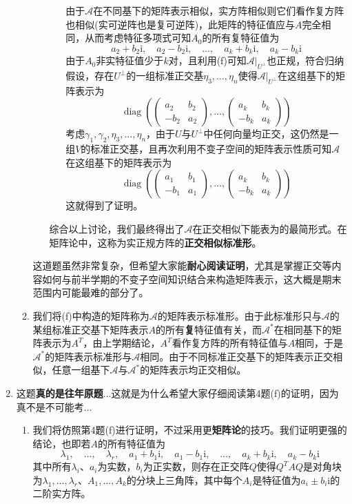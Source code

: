 \documentclass[a4paper,UTF8,fontset=windows,AutoFakeBold]{ctexart}
\DeclareMathOperator{\diag}{diag}
\newcommand*{\ir}{\mathrm{i}}
\newcommand*{\ma}{\mathcal{A}}
\newcommand*{\note}{\noindent *}
\begin{document}
\begin{enumerate}
\begin{enumerate}
\begin{itemize}
\begin{itemize}
                由于$\ma$在不同基下的矩阵表示相似，实方阵相似则它们看作复方阵也相似(实可逆阵也是复可逆阵)，此矩阵的特征值应与$A$完全相同，从而考虑特征多项式可知$A_0$的所有复特征值为
                $$a_2+b_2\ir,\quad a_2-b_2\ir,\quad\dots,\quad a_k+b_k\ir,\quad a_k-b_k\ir$$
                由于$A_0$非实特征值少于$k$对，且利用(f)可知$\ma|_{U^\bot}$也正规，符合归纳假设，存在$U^\bot$的一组标准正交基$\eta_3,\dots,\eta_n$使得$\ma|_{U^\bot}$在这组基下的矩阵表示为
                $$\diag\left(\begin{pmatrix}a_2&b_2\\-b_2&a_2\end{pmatrix},\dots,\begin{pmatrix}a_k&b_k\\-b_k&a_k\end{pmatrix}\right)$$
                考虑$\gamma_1,\gamma_2,\eta_3,\dots,\eta_n$，由于$U$与$U^\bot$中任何向量均正交，这仍然是一组$V$的标准正交基，且再次利用不变子空间的矩阵表示性质可知$\ma$在这组基下的矩阵表示为
                $$\diag\left(\begin{pmatrix}a_1&b_1\\-b_1&a_1\end{pmatrix},\dots,\begin{pmatrix}a_k&b_k\\-b_k&a_k\end{pmatrix}\right)$$
                这就得到了证明。
            \end{itemize}
            \note 综合以上讨论，我们最终得出了$\ma$在正交相似下能表为的最简形式。在矩阵论中，这称为实正规方阵的\textbf{正交相似标准形}。
        \end{itemize}

        \note 这道题虽然非常复杂，但希望大家能\textbf{耐心阅读证明}，尤其是掌握正交等内容如何与前半学期的不变子空间知识结合来构造矩阵表示，这大概是期末范围内可能最难的部分了。

        \item 我们将(f)中构造的矩阵称为$\ma$的矩阵表示标准形。由于此标准形只与$\ma$的某组标准正交基下矩阵表示$A$的所有\textbf{复}特征值有关，而$\ma^*$在相同基下的矩阵表示为$A^T$，由上学期结论，$A^T$看作复方阵的所有特征值与$A$相同，于是$\ma^*$的矩阵表示标准形与$\ma$相同。由于不同标准正交基下的矩阵表示正交相似，任意一组基下$\ma$与$\ma^*$的矩阵表示均正交相似。
    \end{enumerate}

    \item
    \note 这题\textbf{真的是往年原题}...这就是为什么希望大家仔细阅读第4题(f)的证明，因为真不是不可能考...
    \begin{enumerate}
        \item 我们将仿照第4题(f)进行证明，不过采用更\textbf{矩阵论}的技巧。我们证明更强的结论，也即若$A$的所有特征值为
        $$\lambda_1,\quad\dots,\quad\lambda_r,\quad a_1+b_1\ir,\quad a_1-b_1\ir,\quad\dots,\quad a_k+b_k\ir,\quad a_k-b_k\ir$$
        其中所有$\lambda_i$、$a_i$为实数，$b_i$为正实数，则存在正交阵$Q$使得$Q^TAQ$是对角块为$\lambda_1,\dots,\lambda_r$、$A_1,\dots,A_k$的分块上三角阵，其中每个$A_i$是特征值为$a_i\pm b_i\ir$的二阶实方阵。
        

\end{enumerate}
\end{enumerate}
\end{document}
